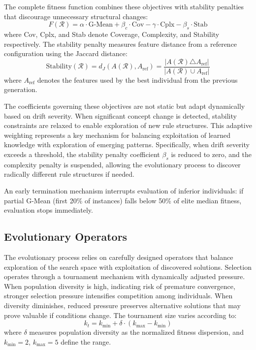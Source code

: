 \documentclass[lettersize,journal]{IEEEtran}
\begin{document}
The complete fitness function combines these objectives with stability penalties that discourage unnecessary structural changes:
\begin{equation}
    F(\mathcal{R}) = \alpha \cdot \text{G-Mean} + \beta_c \cdot \text{Cov} - \gamma \cdot \text{Cplx} - \beta_s \cdot \text{Stab}
    \label{eq:fitness}
\end{equation}
where Cov, Cplx, and Stab denote Coverage, Complexity, and Stability respectively.
The stability penalty measures feature distance from a reference configuration using the Jaccard distance:
\begin{equation}
    \text{Stability}(\mathcal{R}) = d_J(A(\mathcal{R}), A_{\text{ref}}) = \frac{|A(\mathcal{R}) \triangle A_{\text{ref}}|}{|A(\mathcal{R}) \cup A_{\text{ref}}|}
\end{equation}
where $A_{\text{ref}}$ denotes the features used by the best individual from the previous generation.

The coefficients governing these objectives are not static but adapt dynamically based on drift severity. When significant concept change is detected, stability constraints are relaxed to enable exploration of new rule structures. This adaptive weighting represents a key mechanism for balancing exploitation of learned knowledge with exploration of emerging patterns. Specifically, when drift severity exceeds a threshold, the stability penalty coefficient $\beta_s$ is reduced to zero, and the complexity penalty is suspended, allowing the evolutionary process to discover radically different rule structures if needed.

An early termination mechanism interrupts evaluation of inferior individuals: if partial G-Mean (first 20\% of instances) falls below 50\% of elite median fitness, evaluation stops immediately.


\subsection{Evolutionary Operators}

The evolutionary process relies on carefully designed operators that balance exploration of the search space with exploitation of discovered solutions. Selection operates through a tournament mechanism with dynamically adjusted pressure. When population diversity is high, indicating risk of premature convergence, stronger selection pressure intensifies competition among individuals. When diversity diminishes, reduced pressure preserves alternative solutions that may prove valuable if conditions change. The tournament size varies according to:
\begin{equation}
    k_t = k_{\min} + \delta \cdot (k_{\max} - k_{\min})
\end{equation}
where $\delta$ measures population diversity as the normalized fitness dispersion, and $k_{\min}=2$, $k_{\max}=5$ define the range.
\end{document}
